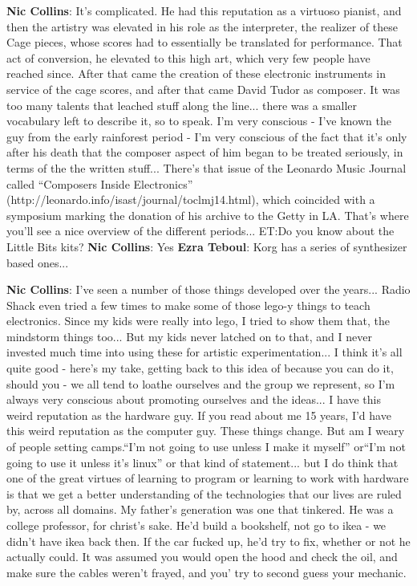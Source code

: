 \textbf{Nic Collins}: It’s complicated. He had this reputation as a virtuoso pianist, and then the artistry was elevated in his role as the interpreter, the realizer of these Cage pieces, whose scores had to essentially be translated for performance. That act of conversion, he elevated to this high art, which very few people have reached since. After that came the creation of these electronic instruments in service of the cage scores, and after that came David Tudor as composer. It was too many talents that leached stuff along the line... there was a smaller vocabulary left to describe it, so to speak. I’m very conscious - I’ve known the guy from the early rainforest period - I’m very conscious of the fact that it’s only after his death that the composer aspect of him began to be treated seriously, in terms of the the written stuff... There’s that issue of the Leonardo Music Journal called ``Composers Inside Electronics'' (http://leonardo.info/isast/journal/toclmj14.html), which coincided with a symposium marking the donation of his archive to the Getty in LA. That’s where you’ll see a nice overview of the different periods...
ET:Do you know about the Little Bits kits?
\textbf{Nic Collins}: Yes 
\textbf{Ezra Teboul}: Korg has a series of synthesizer based ones...
					
\textbf{Nic Collins}: I’ve seen a number of those things developed over the years... Radio Shack even tried a few times to make some of those lego-y things to teach electronics. Since my kids were really into lego, I tried to show them that, the mindstorm things too... But my kids never latched on to that, and I never invested much time into using these for artistic experimentation... I think it’s all quite good - here’s my take, getting back to this idea of because you can do it, should you - we all tend to loathe ourselves and the group we represent, so I’m always very conscious about promoting ourselves and the ideas... I have this weird reputation as the hardware guy. If you read about me 15 years, I’d have this weird reputation as the computer guy. These things change. But am I weary of people setting camps.``I’m not going to use unless I make it myself'' or``I’m not going to use it unless it’s linux'' or that kind of statement... but I do think that one of the great virtues of learning to program or learning to work with hardware is that we get a better understanding of the technologies that our lives are ruled by, across all domains. My father’s generation was one that tinkered. He was a college professor, for christ’s sake. He’d build a bookshelf, not go to ikea - we didn’t have ikea back then. If the car fucked up, he’d try to fix, whether or not he actually could. It was assumed you would open the hood and check the oil, and make sure the cables weren’t frayed, and you’ try to second guess your mechanic.
					
